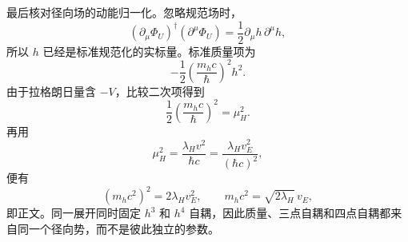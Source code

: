 \begin{derivation}
最后核对径向场的动能归一化。忽略规范场时，
\begin{equation*}
 (\partial_\mu\Phi_U)^\dagger(\partial^\mu\Phi_U)
 =\frac12\partial_\mu h\,\partial^\mu h,
\end{equation*}
所以 $h$ 已经是标准规范化的实标量。标准质量项为
\begin{equation*}
 -\frac12\left(\frac{m_hc}{\hbar}\right)^2h^2.
\end{equation*}
由于拉格朗日量含 $-V$，比较二次项得到
\begin{equation*}
 \frac12\left(\frac{m_hc}{\hbar}\right)^2=\mu_H^2.
\end{equation*}
再用
\begin{equation*}
 \mu_H^2=\frac{\lambda_Hv^2}{\hbar c}
 =\frac{\lambda_Hv_E^2}{(\hbar c)^2},
\end{equation*}
便有
\begin{equation*}
 (m_hc^2)^2=2\lambda_Hv_E^2,
 \qquad
 {m_hc^2=\sqrt{2\lambda_H}\,v_E},
\end{equation*}
即正文。同一展开同时固定 $h^3$ 和 $h^4$ 自耦，因此质量、三点自耦和四点自耦都来自同一个径向势，而不是彼此独立的参数。
\end{derivation}
